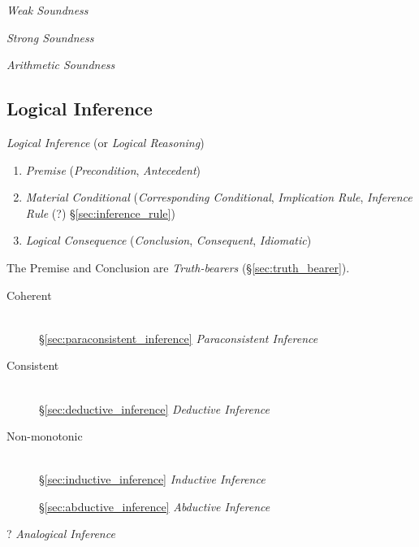 \emph{Weak Soundness}

\emph{Strong Soundness}

\emph{Arithmetic Soundness}



\subsection{Logical Inference}\label{sec:logical_inference}

\emph{Logical Inference} (or \emph{Logical Reasoning})

\begin{enumerate}
\item \emph{Premise} (\emph{Precondition}, \emph{Antecedent})

\item \emph{Material Conditional} (\emph{Corresponding Conditional},
  \emph{Implication Rule}, \emph{Inference Rule} (?)
  \S\ref{sec:inference_rule})

\item \emph{Logical Consequence} (\emph{Conclusion},
  \emph{Consequent}, \emph{Idiomatic})
\end{enumerate}

The Premise and Conclusion are \emph{Truth-bearers}
(\S\ref{sec:truth_bearer}).

\begin{description}
\item [Coherent] \hfill\\
  \S\ref{sec:paraconsistent_inference}
  \emph{Paraconsistent Inference}

\item [Consistent] \hfill\\
  \S\ref{sec:deductive_inference} \emph{Deductive Inference}

\item [Non-monotonic] \hfill\\
  \S\ref{sec:inductive_inference} \emph{Inductive Inference}

  \S\ref{sec:abductive_inference} \emph{Abductive Inference}

\end{description}

? \emph{Analogical Inference}



